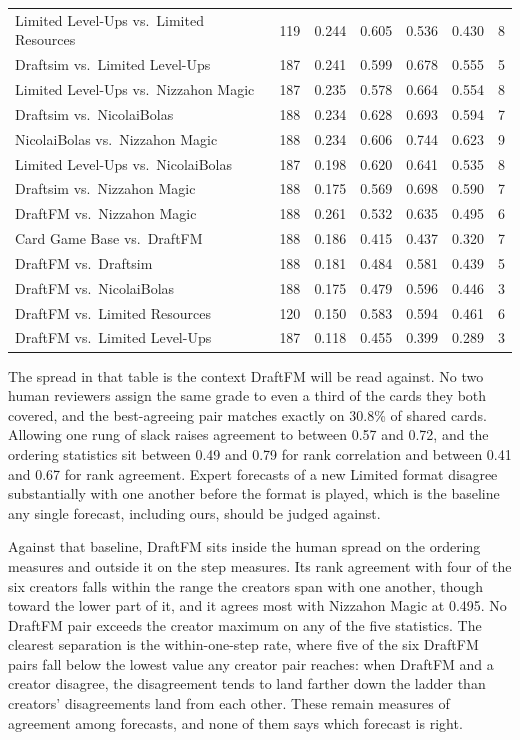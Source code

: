 \documentclass[11pt]{article}
\numberwithin{equation}{section}
\begin{document}
\begin{table}[tb]
{\begin{tabular}{L{0.375\textwidth}rrrrrr}
Limited Level-Ups vs.\ Limited Resources & 119 & 0.244 & 0.605 & 0.536 & 0.430 & 8 \\
Draftsim vs.\ Limited Level-Ups & 187 & 0.241 & 0.599 & 0.678 & 0.555 & 5 \\
Limited Level-Ups vs.\ Nizzahon Magic & 187 & 0.235 & 0.578 & 0.664 & 0.554 & 8 \\
Draftsim vs.\ NicolaiBolas & 188 & 0.234 & 0.628 & 0.693 & 0.594 & 7 \\
NicolaiBolas vs.\ Nizzahon Magic & 188 & 0.234 & 0.606 & 0.744 & 0.623 & 9 \\
Limited Level-Ups vs.\ NicolaiBolas & 187 & 0.198 & 0.620 & 0.641 & 0.535 & 8 \\
Draftsim vs.\ Nizzahon Magic & 188 & 0.175 & 0.569 & 0.698 & 0.590 & 7 \\
\midrule
DraftFM vs.\ Nizzahon Magic & 188 & 0.261 & 0.532 & 0.635 & 0.495 & 6 \\
Card Game Base vs.\ DraftFM & 188 & 0.186 & 0.415 & 0.437 & 0.320 & 7 \\
DraftFM vs.\ Draftsim & 188 & 0.181 & 0.484 & 0.581 & 0.439 & 5 \\
DraftFM vs.\ NicolaiBolas & 188 & 0.175 & 0.479 & 0.596 & 0.446 & 3 \\
DraftFM vs.\ Limited Resources & 120 & 0.150 & 0.583 & 0.594 & 0.461 & 6 \\
DraftFM vs.\ Limited Level-Ups & 187 & 0.118 & 0.455 & 0.399 & 0.289 & 3 \\
\bottomrule
\end{tabular}
}
\end{table}

The spread in that table is the context DraftFM will be read against. No two
human reviewers assign the same grade to even a third of the cards they both
covered, and the best-agreeing pair matches exactly on 30.8\% of shared cards.
Allowing one rung of slack raises agreement to between 0.57 and 0.72, and the
ordering statistics sit between 0.49 and 0.79 for rank correlation and between
0.41 and 0.67 for rank agreement. Expert forecasts of a new Limited format
disagree substantially with one another before the format is played, which is the
baseline any single forecast, including ours, should be judged against.

Against that baseline, DraftFM sits inside the human spread on the ordering
measures and outside it on the step measures. Its rank agreement with four of the
six creators falls within the range the creators span with one another, though
toward the lower part of it, and it agrees most with Nizzahon Magic at 0.495. No
DraftFM pair exceeds the creator maximum on any of the five statistics. The
clearest separation is the within-one-step rate, where five of the six DraftFM
pairs fall below the lowest value any creator pair reaches: when DraftFM and a
creator disagree, the disagreement tends to land farther down the ladder than
creators' disagreements land from each other. These remain measures of agreement
among forecasts, and none of them says which forecast is right.
\end{document}
